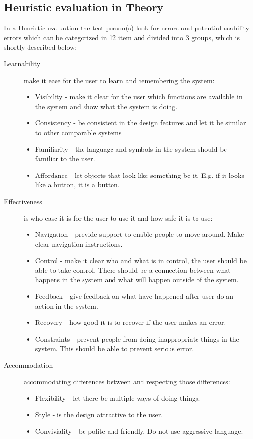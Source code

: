 \subsection{Heuristic evaluation in Theory}
In a Heuristic evaluation the test person(s) look for errors and potential usability errors which can be categorized in 12 item and divided into 3 groups\citep{DIEB}, which is shortly described below:
\begin{description}
\item[Learnability] make it ease for the user to learn and remembering the system:
\begin{itemize}
	\item Visibility - make it clear for the user which functions are available in the system and show what the system is doing.
	\item Consistency - be consistent in the design features and let it be similar to other comparable systems %
	\item Familiarity - the language and symbols in the system should be familiar to the user.
	\item Affordance - let objects that look like something be it. E.g. if it looks like a button, it is a button. %
\end{itemize}

\item[Effectiveness] is who ease it is for the user to use it and how safe it is to use:
\begin{itemize}
	\item Navigation - provide support to enable people to move around. Make clear navigation instructions.
	\item Control - make it clear who and what is in control, the user should be able to take control. There should be a connection between what happens in the system and what will happen outside of the system. 
	\item Feedback - give feedback on what have happened after user do an action in the system.
	\item Recovery - how good it is to recover if the user makes an error. %
	\item Constraints - prevent people from doing inappropriate things in the system. This should be able to prevent serious error.
\end{itemize}

\item[Accommodation] accommodating differences between and respecting those differences:
\begin{itemize}
	\item Flexibility - let there be multiple ways of doing things.%
	\item Style - is the design attractive to the user. %
	\item Conviviality - be polite and friendly. Do not use aggressive language.
\end{itemize}
\end{description}
